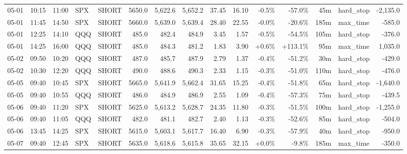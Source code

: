 \documentclass[11pt,a4paper,twoside]{article}
\begin{document}
\begin{landscape}
\begin{center}
\begin{longtable}{>{\color{txtmain}}l l l l l r r r r r r r r >{\color{txtmain}}l r}
05-01 & 10:15 & 11:00 & SPX & SHORT & 5650.0 & 5,622.6 & 5,652.2 & 37.45 & 16.10 & \textcolor{lossred}{-0.5\%} & \textcolor{lossred}{-57.0\%} & 45m & hard\_stop & \textcolor{lossred}{-2,135.0} \\
05-01 & 11:45 & 14:50 & SPX & SHORT & 5660.0 & 5,639.0 & 5,639.4 & 28.40 & 22.55 & \textcolor{lossred}{-0.0\%} & \textcolor{lossred}{-20.6\%} & 185m & max\_time & \textcolor{lossred}{-585.0} \\
05-01 & 12:25 & 14:10 & QQQ & SHORT & 485.0 & 482.4 & 484.9 & 3.45 & 1.57 & \textcolor{lossred}{-0.5\%} & \textcolor{lossred}{-54.5\%} & 105m & hard\_stop & \textcolor{lossred}{-376.0} \\
05-01 & 14:25 & 16:00 & QQQ & SHORT & 485.0 & 484.3 & 481.2 & 1.83 & 3.90 & \textcolor{wingreen}{+0.6\%} & \textcolor{wingreen}{+113.1\%} & 95m & max\_time & \textcolor{wingreen}{1,035.0} \\
05-02 & 09:50 & 10:20 & QQQ & SHORT & 487.0 & 485.7 & 487.9 & 2.79 & 1.37 & \textcolor{lossred}{-0.4\%} & \textcolor{lossred}{-51.2\%} & 30m & hard\_stop & \textcolor{lossred}{-429.0} \\
05-02 & 10:30 & 12:20 & QQQ & SHORT & 490.0 & 488.6 & 490.3 & 2.33 & 1.15 & \textcolor{lossred}{-0.3\%} & \textcolor{lossred}{-51.0\%} & 110m & hard\_stop & \textcolor{lossred}{-476.0} \\
05-05 & 09:40 & 10:45 & SPX & SHORT & 5665.0 & 5,641.9 & 5,662.4 & 31.65 & 15.25 & \textcolor{lossred}{-0.4\%} & \textcolor{lossred}{-51.8\%} & 65m & hard\_stop & \textcolor{lossred}{-1,640.0} \\
05-05 & 09:40 & 10:55 & QQQ & SHORT & 486.0 & 484.9 & 486.9 & 2.55 & 1.09 & \textcolor{lossred}{-0.4\%} & \textcolor{lossred}{-57.3\%} & 75m & hard\_stop & \textcolor{lossred}{-439.5} \\
05-06 & 09:40 & 11:20 & SPX & SHORT & 5625.0 & 5,613.2 & 5,628.7 & 24.35 & 11.80 & \textcolor{lossred}{-0.3\%} & \textcolor{lossred}{-51.5\%} & 100m & hard\_stop & \textcolor{lossred}{-1,255.0} \\
05-06 & 09:40 & 11:05 & QQQ & SHORT & 482.0 & 481.1 & 482.7 & 2.40 & 1.13 & \textcolor{lossred}{-0.3\%} & \textcolor{lossred}{-52.6\%} & 85m & hard\_stop & \textcolor{lossred}{-504.0} \\
05-06 & 13:45 & 14:25 & SPX & SHORT & 5615.0 & 5,603.1 & 5,617.7 & 16.40 & 6.90 & \textcolor{lossred}{-0.3\%} & \textcolor{lossred}{-57.9\%} & 40m & hard\_stop & \textcolor{lossred}{-950.0} \\
05-07 & 09:40 & 12:45 & SPX & SHORT & 5635.0 & 5,618.6 & 5,615.8 & 35.65 & 32.15 & \textcolor{wingreen}{+0.0\%} & \textcolor{lossred}{-9.8\%} & 185m & max\_time & \textcolor{lossred}{-350.0} \\

\end{longtable}
\end{center}
\end{landscape}
\end{document}
